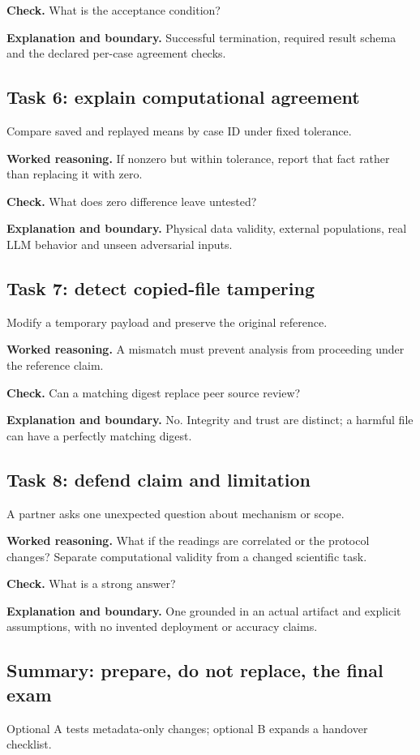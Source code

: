 \textbf{Check.} What is the acceptance condition?

\textbf{Explanation and boundary.} Successful termination, required result schema and the declared per-case agreement checks.

\subsection{Task 6: explain computational agreement}
Compare saved and replayed means by case ID under fixed tolerance.

\textbf{Worked reasoning.} If nonzero but within tolerance, report that fact rather than replacing it with zero.

\textbf{Check.} What does zero difference leave untested?

\textbf{Explanation and boundary.} Physical data validity, external populations, real LLM behavior and unseen adversarial inputs.

\subsection{Task 7: detect copied-file tampering}
Modify a temporary payload and preserve the original reference.

\textbf{Worked reasoning.} A mismatch must prevent analysis from proceeding under the reference claim.

\textbf{Check.} Can a matching digest replace peer source review?

\textbf{Explanation and boundary.} No. Integrity and trust are distinct; a harmful file can have a perfectly matching digest.

\subsection{Task 8: defend claim and limitation}
A partner asks one unexpected question about mechanism or scope.

\textbf{Worked reasoning.} What if the readings are correlated or the protocol changes? Separate computational validity from a changed scientific task.

\textbf{Check.} What is a strong answer?

\textbf{Explanation and boundary.} One grounded in an actual artifact and explicit assumptions, with no invented deployment or accuracy claims.

\subsection{Summary: prepare, do not replace, the final exam}
Optional A tests metadata-only changes; optional B expands a handover checklist.

